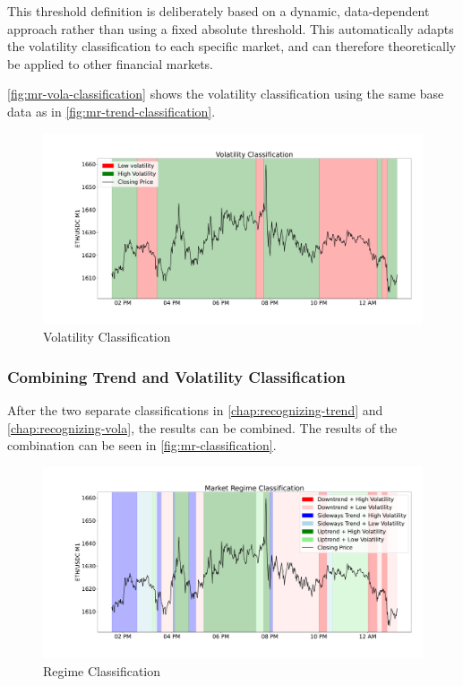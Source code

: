 This threshold definition is deliberately based on a dynamic, data-dependent approach rather than using a fixed absolute threshold.
This automatically adapts the volatility classification to each specific market, and can therefore theoretically be applied to other financial markets.

\autoref{fig:mr-vola-classification} shows the volatility classification using the same base data as in \autoref{fig:mr-trend-classification}.

\begin{figure}[H]
    \centering
    \includegraphics[width=\textwidth]{images/market-regime/market_regime_vola}
    \caption{Volatility Classification}
    \label{fig:mr-vola-classification}
\end{figure}

\subsubsection{Combining Trend and Volatility Classification}

After the two separate classifications in \autoref{chap:recognizing-trend} and \autoref{chap:recognizing-vola}, the results can be combined.
The results of the combination can be seen in \autoref{fig:mr-classification}.

\begin{figure}[H]
    \centering
    \includegraphics[width=\textwidth]{images/market-regime/market_regime}
    \caption{Regime Classification}
    \label{fig:mr-classification}
\end{figure}

